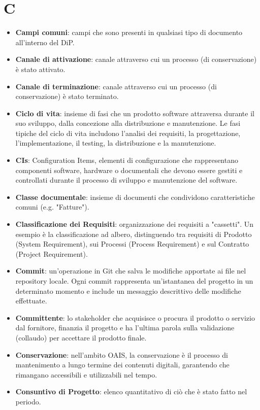 \documentclass[a4paper,12pt]{article}
\begin{document}
\section{C}
\begin{itemize}
    \item \textbf{Campi comuni}: campi che sono presenti in qualsiasi tipo di documento all'interno del DiP.
    \item \textbf{Canale di attivazione}: canale attraverso cui un processo (di conservazione) è stato attivato.
    \item \textbf{Canale di terminazione}: canale attraverso cui un processo (di conservazione) è stato terminato.
    \item \textbf{Ciclo di vita}: insieme di fasi che un prodotto software attraversa durante il suo sviluppo, dalla concezione alla distribuzione e manutenzione. Le fasi tipiche del ciclo di vita includono l'analisi dei requisiti, la progettazione, l'implementazione, il testing, la distribuzione e la manutenzione.
    \item \textbf{CIs}: Configuration Items, elementi di configurazione che rappresentano componenti software, hardware o documentali che devono essere gestiti e controllati durante il processo di sviluppo e manutenzione del software.
    \item \textbf{Classe documentale}: insieme di documenti che condividono caratteristiche comuni (e.g. "Fatture").
    \item \textbf{Classificazione dei Requisiti}: organizzazione dei requisiti a "cassetti". Un esempio è la classificazione ad albero, distinguendo tra requisiti di Prodotto (System Requirement), sui Processi (Process Requirement) e sul Contratto (Project Requirement).
    \item \textbf{Commit}: un'operazione in Git che salva le modifiche apportate ai file nel repository locale. Ogni commit rappresenta un'istantanea del progetto in un determinato momento e include un messaggio descrittivo delle modifiche effettuate.
    \item \textbf{Committente}: lo stakeholder che acquisisce o procura il prodotto o servizio dal fornitore, finanzia il progetto e ha l'ultima parola sulla validazione (collaudo) per accettare il prodotto finale.
    \item \textbf{Conservazione}: nell'ambito OAIS, la conservazione è il processo di mantenimento a lungo termine dei contenuti digitali, garantendo che rimangano accessibili e utilizzabili nel tempo.
    \item \textbf{Consuntivo di Progetto}: elenco quantitativo di ciò che è stato fatto nel periodo.

\end{itemize}
\end{document}
